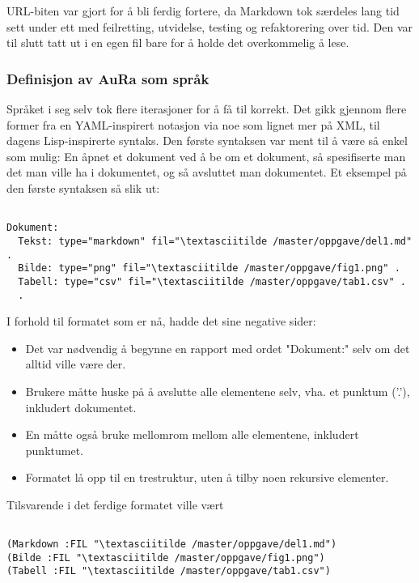 \documentclass[11pt]{article}
\begin{document}
URL-biten var gjort for å bli ferdig fortere, da Markdown tok særdeles lang tid sett under ett med feilretting, utvidelse, testing og refaktorering over tid. Den var til slutt tatt ut i en egen fil bare for å holde det overkommelig å lese.



\subsubsection{Definisjon av AuRa som språk}



Språket i seg selv tok flere iterasjoner for å få til korrekt.
Det gikk gjennom flere former fra en YAML-inspirert notasjon via noe som lignet mer på XML, til dagens Lisp-inspirerte syntaks.
Den første syntaksen var ment til å være så enkel som mulig: En åpnet et dokument ved å be om et dokument, så spesifiserte man det man ville ha i dokumentet, og så avsluttet man dokumentet. Et eksempel på den første syntaksen så slik ut:




\begin{lstlisting}

Dokument:
  Tekst: type="markdown" fil="\textasciitilde /master/oppgave/del1.md" .
  Bilde: type="png" fil="\textasciitilde /master/oppgave/fig1.png" .
  Tabell: type="csv" fil="\textasciitilde /master/oppgave/tab1.csv" .
  .
\end{lstlisting}




I forhold til formatet som er nå, hadde det sine negative sider:




\begin{itemize}
\item Det var nødvendig å begynne en rapport med ordet "Dokument:" selv om det alltid ville være der.
\item Brukere måtte huske på å avslutte alle elementene selv, vha. et punktum ('.'), inkludert dokumentet.
\item En måtte også bruke mellomrom mellom alle elementene, inkludert punktumet.
\item Formatet lå opp til en trestruktur, uten å tilby noen rekursive elementer.
\end{itemize}




Tilsvarende i det ferdige formatet ville vært




\begin{lstlisting}

(Markdown :FIL "\textasciitilde /master/oppgave/del1.md")
(Bilde :FIL "\textasciitilde /master/oppgave/fig1.png")
(Tabell :FIL "\textasciitilde /master/oppgave/tab1.csv")
\end{lstlisting}
\end{document}
